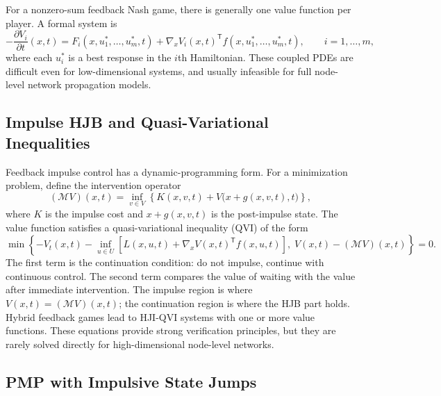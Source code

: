 \documentclass[11pt,a4paper]{article}
\newcommand{\T}{\mathsf{T}}
\begin{document}
For a nonzero-sum feedback Nash game, there is generally one value function per player. A formal system is
\begin{equation}
  -\frac{\partial V_i}{\partial t}(x,t)=
  F_i(x,u_1^*,\dots,u_m^*,t)+\nabla_xV_i(x,t)^{\T}f(x,u_1^*,\dots,u_m^*,t),
  \qquad i=1,\dots,m,
\end{equation}
where each $u_i^*$ is a best response in the $i$th Hamiltonian. These coupled PDEs are difficult even for low-dimensional systems, and usually infeasible for full node-level network propagation models.



\subsection{Impulse HJB and Quasi-Variational Inequalities}
\label{subsec:qvi}

Feedback impulse control has a dynamic-programming form. For a minimization problem, define the intervention operator
\begin{equation}
  (\mathcal{M}V)(x,t)=\inf_{v\in V}\left\{K(x,v,t)+V\bigl(x+g(x,v,t),t\bigr)\right\},
\end{equation}
where $K$ is the impulse cost and $x+g(x,v,t)$ is the post-impulse state. The value function satisfies a quasi-variational inequality (QVI) of the form
\begin{equation}
  \min\left\{
  -V_t(x,t)-\inf_{u\in U}\left[L(x,u,t)+\nabla_xV(x,t)^\T f(x,u,t)\right],
  \;V(x,t)-(\mathcal{M}V)(x,t)
  \right\}=0.
  \label{eq:qvi}
\end{equation}
The first term is the continuation condition: do not impulse, continue with continuous control. The second term compares the value of waiting with the value after immediate intervention. The impulse region is where $V(x,t)=(\mathcal{M}V)(x,t)$; the continuation region is where the HJB part holds. Hybrid feedback games lead to HJI-QVI systems with one or more value functions. These equations provide strong verification principles, but they are rarely solved directly for high-dimensional node-level networks.

\subsection{PMP with Impulsive State Jumps}
\end{document}
